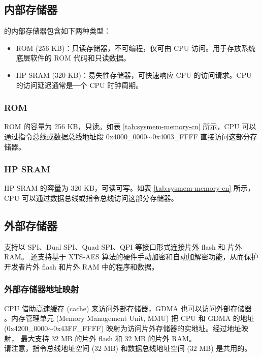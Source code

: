 \documentclass[main\_\_CN.tex]{subfiles}
\begin{document}


\subsection{内部存储器}
\label{para:sysmem-internal-memory}

\chipname{} 的内部存储器包含如下两种类型：

\begin{itemize}
    \item ROM (256 KB)：只读存储器，不可编程，仅可由 CPU 访问。用于存放系统底层软件的 ROM 代码和只读数据。
    \item HP SRAM (320 KB)：易失性存储器，可快速响应 CPU 的访问请求。CPU 的访问延迟通常是一个 CPU 时钟周期。
\end{itemize}

\subsubsection{ROM}
\label{par:rom}

ROM 的容量为 256 KB，只读。如表 \ref{tab:sysmem-memory-cn} 所示，CPU 可以通过指令总线或数据总线地址段 0x4000\_0000$\sim$0x4003\_FFFF 直接访问这部分存储器。

\subsubsection{HP SRAM}
\label{other:sysmem-internal-sram-0}

HP SRAM 的容量为 320 KB，可读可写。如表 \ref{tab:sysmem-memory-cn} 所示，CPU 可以通过数据总线或指令总线访问这部分存储器。

\subsection{外部存储器} 
\label{para:sysmem-external-memory}

\chipname{} 支持以 SPI、Dual SPI、Quad SPI、QPI 等接口形式连接片外 flash 和 片外 RAM。 
\chipname{} 还支持基于 XTS-AES 算法的硬件手动加密和自动加解密功能，从而保护开发者片外 flash 和片外 RAM 中的程序和数据。

\subsubsection{外部存储器地址映射}

CPU 借助高速缓存 (cache) 来访问外部存储器，GDMA 也可以访问外部存储器 。内存管理单元 (Memory Management Unit, MMU) 把 CPU 和 GDMA 的地址 (0x4200\_0000$\sim$0x43FF\_FFFF) 映射为访问片外存储器的实地址。经过地址映射，\chipname{} 最大支持 32 MB 的片外 flash 和 32 MB 的片外 RAM。\\
请注意，指令总线地址空间 (32 MB) 和数据总线地址空间 (32 MB) 是共用的。 
\end{document}
